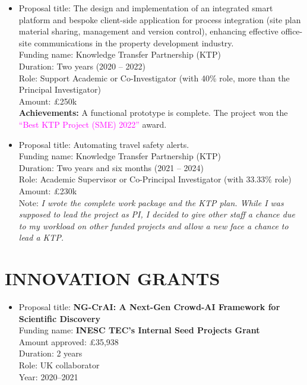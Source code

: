 \documentclass[margin]{res}
\begin{document}
\begin{resume}
\begin{itemize}
    \item Proposal title: The design and implementation of an integrated smart platform and bespoke client-side application for process integration (site plan material sharing, management and version control), enhancing effective office-site communications in the property development industry. \\
    Funding name: Knowledge Transfer Partnership (KTP)\\
    Duration: Two years (2020 -- 2022) \\
    Role: Support Academic or Co-Investigator (with 40\% role, more than the Principal Investigator) \\
    Amount: \pounds250k \\
    \textbf{Achievements:} A functional prototype is complete. The project won the \textcolor{magenta}{``Best KTP Project (SME) 2022''} award.
    
    \item Proposal title: Automating travel safety alerts. \\
    Funding name: Knowledge Transfer Partnership (KTP)\\
    Duration: Two years and six months (2021 -- 2024) \\
    Role: Academic Supervisor or Co-Principal Investigator (with 33.33\% role) \\
    Amount: \pounds230k \\
    Note: \textit{I wrote the complete work package and the KTP plan. While I was supposed to lead the project as PI, I decided to give other staff a chance due to my workload on other funded projects and allow a new face a chance to lead a KTP.}
\end{itemize}

\section{INNOVATION GRANTS}
\begin{itemize}
    \item Proposal title: \textbf{NG-CrAI: A Next-Gen Crowd-AI Framework for Scientific Discovery} \\
Funding name: \textbf{INESC TEC's Internal Seed Projects Grant} \\
Amount approved: \pounds35,938 \\
Duration: 2 years \\
Role: UK collaborator \\
Year: 2020--2021


\end{itemize}
\end{resume}
\end{document}
